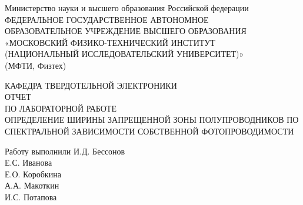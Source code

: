 \documentclass[a4paper, 12pt]{article}
\begin{document}
\begin{titlepage}
    \newpage
    \begin{center}
     Министерство науки и высшего образования Российской федерации \\ ФЕДЕРАЛЬНОЕ ГОСУДАРСТВЕННОЕ АВТОНОМНОЕ \\ ОБРАЗОВАТЕЛЬНОЕ УЧРЕЖДЕНИЕ ВЫСШЕГО ОБРАЗОВАНИЯ \\ «МОСКОВСКИЙ ФИЗИКО-ТЕХНИЧЕСКИЙ ИНСТИТУТ \\ (НАЦИОНАЛЬНЫЙ ИССЛЕДОВАТЕЛЬСКИЙ УНИВЕРСИТЕТ)» \\ (МФТИ, Физтех)
    \end{center}
    
    \vspace{15em}
    
    \begin{center}
    КАФЕДРА ТВЕРДОТЕЛЬНОЙ ЭЛЕКТРОНИКИ \\
    \vspace{1em}
    ОТЧЕТ\\
    ПО ЛАБОРАТОРНОЙ РАБОТЕ \\
    \vspace{1em}
    ОПРЕДЕЛЕНИЕ ШИРИНЫ ЗАПРЕЩЕННОЙ ЗОНЫ ПОЛУПРОВОДНИКОВ ПО СПЕКТРАЛЬНОЙ ЗАВИСИМОСТИ СОБСТВЕННОЙ ФОТОПРОВОДИМОСТИ
    \end{center}

    \vspace{10em}
    \begin{flushleft}
        Работу выполнили \hspace{17em} \underline{\hspace{3cm}}
        И.Д. Бессонов \\
         \hspace{26em} \underline{\hspace{3cm}} Е.С. Иванова \\
          \hspace{26em} \underline{\hspace{2.6cm}} Е.О. Коробкина\\
          \hspace{26em} \underline{\hspace{3cm}} А.А. Макоткин\\
        \hspace{26em}
        И.С. Потапова
    \end{flushleft}


\end{titlepage}
\end{document}
